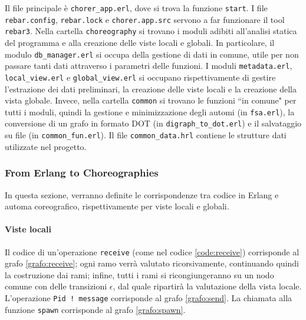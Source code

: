Il file principale \`e \texttt{chorer\_app.erl}, dove si trova la funzione \texttt{start}. I file \texttt{rebar.config}, \texttt{rebar.lock} e \texttt{chorer.app.src} servono a far funzionare il tool \texttt{rebar3}. Nella cartella \texttt{choreography} si trovano i moduli adibiti all'analisi statica del programma e alla creazione delle viste locali e globali. In particolare, il modulo \texttt{db\_manager.erl} si occupa della gestione di dati in comune, utile per non passare tanti dati attraverso i parametri delle funzioni. I moduli \texttt{metadata.erl}, \texttt{local\_view.erl} e \texttt{global\_view.erl} si occupano rispettivamente di gestire l'estrazione dei dati preliminari, la creazione delle viste locali e la creazione della vista globale. Invece, nella cartella \texttt{common} si trovano le funzioni ``in comune" per tutti i moduli, quindi la gestione e minimizzazione degli automi (in \texttt{fsa.erl}), la conversione di un grafo in formato DOT (in \texttt{digraph\_to\_dot.erl}) e il salvataggio su file (in \texttt{common\_fun.erl}). Il file \texttt{common\_data.hrl} contiene le strutture dati utilizzate nel progetto.


\subsubsection{From Erlang to Choreographies}
\label{sec:corrisp}
In questa sezione, verranno definite le corrispondenze tra codice in Erlang e automa coreografico, rispettivamente per viste locali e globali.

\paragraph{Viste locali}

Il codice di un'operazione \texttt{receive} (come nel codice \ref{code:receive}) corrisponde al grafo \ref{grafo:receive}; ogni ramo verr\`a valutato ricorsivamente, continuando quindi la costruzione dai rami; infine, tutti i rami si ricongiungeranno su un nodo comune con delle transizioni $\epsilon$, dal quale ripartir\`a la valutazione della vista locale. L'operazione \texttt{Pid ! message} corrisponde al grafo \ref{grafo:send}. La chiamata alla funzione \texttt{spawn} corrisponde al grafo \ref{grafo:spawn}.

\bigskip

